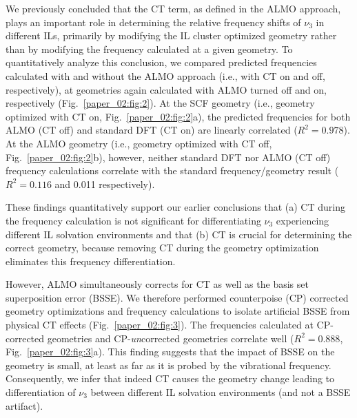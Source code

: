We previously concluded\cite{Brinzer2015} that the CT term, as defined in the ALMO approach, plays an important role in determining the relative frequency shifts of \(\nu_{3}\) in different ILs, primarily by modifying the \textendash{}IL cluster optimized geometry rather than by modifying the frequency calculated at a given geometry. To quantitatively analyze this conclusion, we compared predicted frequencies calculated with and without the ALMO approach (i.e., with CT on and off, respectively), at geometries again calculated with ALMO turned off and on, respectively (Fig.~\ref{paper_02:fig:2}). At the SCF geometry (i.e., geometry optimized with CT on, Fig.~\ref{paper_02:fig:2}a), the predicted frequencies for both ALMO (CT off) and standard DFT (CT on) are linearly correlated (\(R^2 = 0.978\)). At the ALMO geometry (i.e., geometry optimized with CT off, Fig.~\ref{paper_02:fig:2}b), however, neither standard DFT nor ALMO (CT off) frequency calculations correlate with the standard frequency/geometry result (\(R^2 = 0.116\) and \num{0.011} respectively).

These findings quantitatively support our earlier conclusions that (a) CT during the frequency calculation is not significant for differentiating \(\nu_{3}\) experiencing different IL solvation environments and that (b) CT is crucial for determining the correct geometry, because removing CT during the geometry optimization eliminates this frequency differentiation.

However, ALMO simultaneously corrects for CT as well as the basis set superposition error (BSSE). We therefore performed counterpoise (CP) corrected geometry optimizations and frequency calculations to isolate artificial BSSE from physical CT effects (Fig.~\ref{paper_02:fig:3}).\cite{JCC:JCC24312,Rezac} The frequencies calculated at CP-corrected geometries and CP-\emph{un}corrected geometries correlate well (\(R^2 = 0.888\), Fig.~\ref{paper_02:fig:3}a). This finding suggests that the impact of BSSE on the geometry is small, at least as far as it is probed by the vibrational frequency. Consequently, we infer that indeed CT causes the geometry change leading to differentiation of \(\nu_{3}\) between different IL solvation environments (and not a BSSE artifact).

